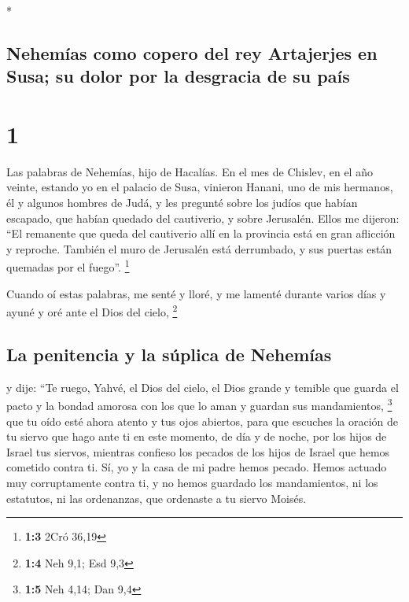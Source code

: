 \begin{paracol}{2} \switchcolumn[0]*

\hypertarget{nehemuxedas-como-copero-del-rey-artajerjes-en-susa-su-dolor-por-la-desgracia-de-su-pauxeds}{%
\subsection{Nehemías como copero del rey Artajerjes en Susa; su dolor
por la desgracia de su
país}\label{nehemuxedas-como-copero-del-rey-artajerjes-en-susa-su-dolor-por-la-desgracia-de-su-pauxeds}}

\hypertarget{section}{%
\section{1}\label{section}}

 Las palabras de Nehemías, hijo de Hacalías. En el mes de
Chislev, en el año veinte, estando yo en el palacio de Susa,
 vinieron Hanani, uno de mis hermanos, él y algunos
hombres de Judá, y les pregunté sobre los judíos que habían escapado,
que habían quedado del cautiverio, y sobre Jerusalén. 
Ellos me dijeron: ``El remanente que queda del cautiverio allí en la
provincia está en gran aflicción y reproche. También el muro de
Jerusalén está derrumbado, y sus puertas están quemadas por el fuego''.
\footnote{\textbf{1:3} 2Cró 36,19}

 Cuando oí estas palabras, me senté y lloré, y me lamenté
durante varios días y ayuné y oré ante el Dios del cielo, \footnote{\textbf{1:4}
  Neh 9,1; Esd 9,3}

\hypertarget{la-penitencia-y-la-suxfaplica-de-nehemuxedas}{%
\subsection{La penitencia y la súplica de
Nehemías}\label{la-penitencia-y-la-suxfaplica-de-nehemuxedas}}

 y dije: ``Te ruego, Yahvé, el Dios del cielo, el Dios
grande y temible que guarda el pacto y la bondad amorosa con los que lo
aman y guardan sus mandamientos, \footnote{\textbf{1:5} Neh 4,14; Dan
  9,4}  que tu oído esté ahora atento y tus ojos abiertos,
para que escuches la oración de tu siervo que hago ante ti en este
momento, de día y de noche, por los hijos de Israel tus siervos,
mientras confieso los pecados de los hijos de Israel que hemos cometido
contra ti. Sí, yo y la casa de mi padre hemos pecado. 
Hemos actuado muy corruptamente contra ti, y no hemos guardado los
mandamientos, ni los estatutos, ni las ordenanzas, que ordenaste a tu
siervo Moisés.


\end{paracol}
